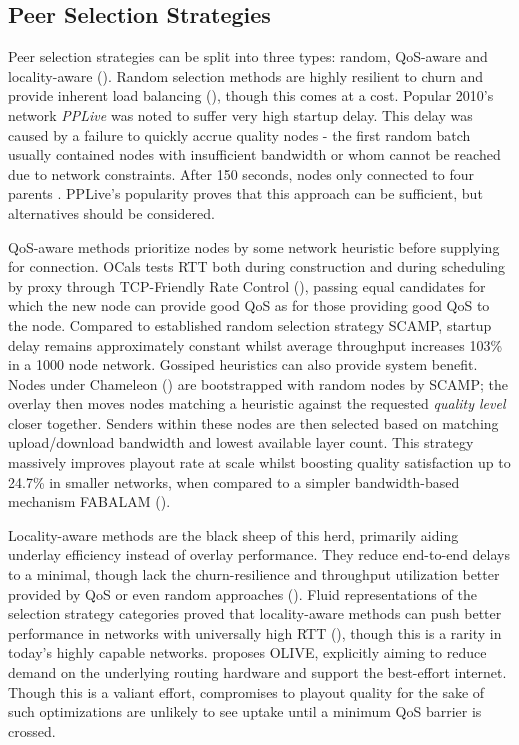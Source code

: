 \documentclass[12pt,a4paper]{article}
\begin{document}
\subsection{Peer Selection Strategies} \label{litreview:selection}
Peer selection strategies can be split into three types: random, QoS-aware and locality-aware (\cite{Kim2018}). Random selection methods are highly resilient to churn and provide inherent load balancing  (\cite{Wang2013}), though this comes at a cost. Popular 2010's network \textit{PPLive} was noted to suffer very high startup delay. This delay was caused by a failure to quickly accrue quality nodes - the first random batch usually contained nodes with insufficient bandwidth or whom cannot be reached due to network constraints. After 150 seconds, nodes only connected to four parents \cite{Hei2008}. PPLive's popularity proves that this approach can be sufficient, but alternatives should be considered.

QoS-aware methods prioritize nodes by some network heuristic before supplying for connection. OCals tests RTT both during construction and during scheduling by proxy through TCP-Friendly Rate Control (\cite{Floyd2000}), passing equal candidates for which the new node can provide good QoS as for those providing good QoS to the node. Compared to established random selection strategy SCAMP, startup delay remains approximately constant whilst average throughput increases 103\% in a 1000 node network. Gossiped heuristics can also provide system benefit. Nodes under Chameleon (\cite{Nguyen2010}) are bootstrapped with random nodes by SCAMP; the overlay then moves nodes matching a heuristic against the requested \textit{quality level} closer together. Senders within these nodes are then selected based on matching upload/download bandwidth and lowest available layer count. This strategy massively improves playout rate at scale  whilst boosting quality satisfaction up to 24.7\% in smaller networks, when compared to a simpler bandwidth-based mechanism FABALAM (\cite{Liu2004}).

Locality-aware methods are the black sheep of this herd, primarily aiding underlay efficiency instead of overlay performance. They reduce end-to-end delays to a minimal, though lack the churn-resilience and throughput utilization better provided by QoS or even random approaches (\cite{Zhao2012}). Fluid representations of the selection strategy categories proved that locality-aware methods can push better performance in networks with universally high RTT (\cite{CoutodaSilva2011}), though this is a rarity in today's highly capable networks. \cite{Magharei2014} proposes OLIVE, explicitly aiming to reduce demand on the underlying routing hardware and support the best-effort internet. Though this is a valiant effort, compromises to playout quality for the sake of such optimizations are
unlikely to see uptake until a minimum QoS barrier is crossed.
\end{document}
